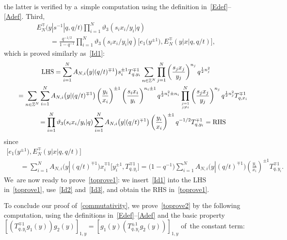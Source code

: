 \documentclass[pdftex]{sigma}%
\numberwithin{equation}{section}
\newcommand{\setatop}[2]{\genfrac{}{}{0pt}{}{#1}{#2}}
\newcommand{\Z}{{\mathbb Z}}
\begin{document}
the latter is verified by a~simple computation using the definition in~\eqref{Edef}--\eqref{Adef}. Third,
\begin{gather}
E^\mp_N\big(y|s^{-1}|q,q/t\big) \prod_{i=1}^N\!\vartheta_3(s_ix_i/y_i|q) \nonumber\\
\qquad{} = \frac{q^{-1/2}}{1-q^{-1}} \prod_{i=1}^N\!\vartheta_3(s_ix_i/y_i|q) \big[e_1\big(y^{\pm 1}\big),E^\mp_N(y|x|q,q/t)\big],\label{Id3}
\end{gather}
which is proved similarly as~\eqref{Id1}:
\begin{gather*}
\text{LHS} = \sum_{i=1}^N A_{N,i}\big(y|(q/t)^{\mp 1}\big) s^{\pm 1}_i T_{q,y_i}^{\mp 1} \sum_{n\in\Z^N} \prod_{j=1}^N\left(\frac{s_j x_j}{y_j} \right)^{n_j}q^{\frac12 n_j^2}
\\ \hphantom{\text{LHS}}
{}= \sum_{n\in\Z^N} \sum_{i=1}^N A_{N,i}\big(y|(q/t)^{\mp 1}\big) \left(\frac{y_i}{x_i}\right)^{\pm 1} \left(\frac{s_i x_i}{y_i} \right)^{n_i\pm 1}q^{\frac12n_i^2\pm n_i} \prod_{\setatop{j=1}{j\neq i}}^N\left(\frac{s_j x_j}{y_j} \right)^{n_j}q^{\frac12 n_j^2} T_{q,x_i}^{\mp 1}
\\ \hphantom{\text{LHS}}
{}= \prod_{i=1}^N\vartheta_3(s_ix_i/y_i|q) \sum_{i=1}^N A_{N,i}\big(y|(q/t)^{\mp 1}\big) \left( \frac{y_i}{x_i}\right)^{\pm 1} q^{-1/2} T_{q,y_i}^{\mp 1} =\text{RHS}
\end{gather*}
since
\begin{gather*}
\big [e_1\big(y^{\pm 1}\big),E^\mp_N(y|x|q,q/t)\big]
 \\ \qquad{}= \sum_{i=1}^N A_{N,i}\big(y|(q/t)^{\mp 1}\big) x_i^{\mp 1}\big[y_i^{\pm 1},T_{q,y_i}^{\mp 1}\big]
 = \big(1-q^{-1}\big)\sum_{i=1}^N A_{N,i}\big(y|(q/t)^{\mp 1}\big) \left(\frac{y_i}{x_i}\right)^{\pm 1}T_{q,y_i}^{\mp 1}.
\end{gather*}
We~are now ready to prove~\eqref{toprove1}: we insert~\eqref{Id1} into the LHS in~\eqref{toprove1}, use~\eqref{Id2} and~\eqref{Id3}, and obtain the RHS in~\eqref{toprove1}.

To conclude our proof of~\eqref{commutativity}, we prove~\eqref{toprove2} by the following computation, using the definitions in~\eqref{Edef}--\eqref{Adef} and the basic property $\left[ \left(T_{q,y_i}^{\mp 1}g_1(y)\right) g_2(y)\right]_{1,y} = \left[ g_1(y)\left(T_{q,y_i}^{\pm 1}g_2(y)\right)\right]_{1,y}$ of~the constant term:
\end{document}
